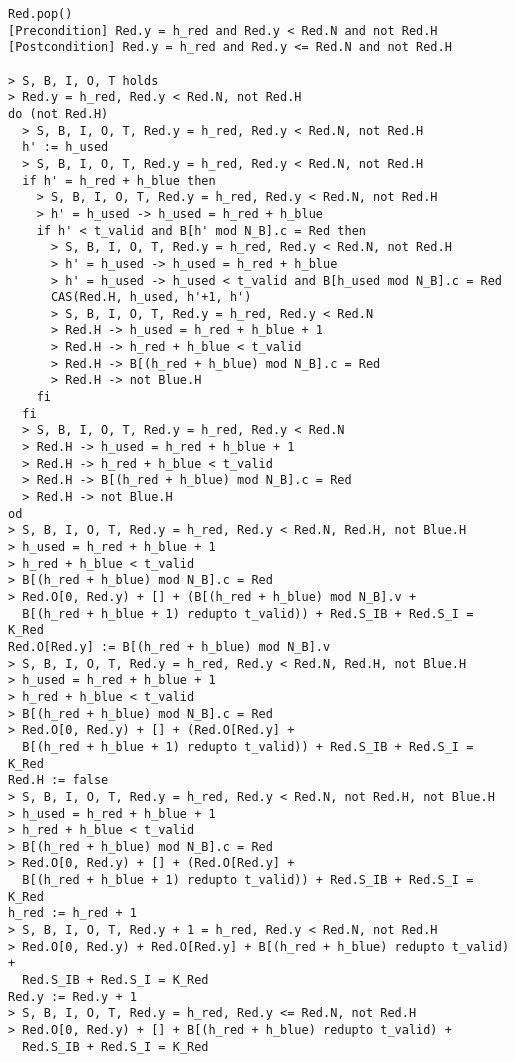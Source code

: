 \documentclass[a4paper, 11pt]{article}
\begin{document}
\begin{verbatim}
Red.pop()
[Precondition] Red.y = h_red and Red.y < Red.N and not Red.H
[Postcondition] Red.y = h_red and Red.y <= Red.N and not Red.H

> S, B, I, O, T holds
> Red.y = h_red, Red.y < Red.N, not Red.H
do (not Red.H)
  > S, B, I, O, T, Red.y = h_red, Red.y < Red.N, not Red.H
  h' := h_used
  > S, B, I, O, T, Red.y = h_red, Red.y < Red.N, not Red.H
  if h' = h_red + h_blue then
    > S, B, I, O, T, Red.y = h_red, Red.y < Red.N, not Red.H
    > h' = h_used -> h_used = h_red + h_blue
    if h' < t_valid and B[h' mod N_B].c = Red then
      > S, B, I, O, T, Red.y = h_red, Red.y < Red.N, not Red.H
      > h' = h_used -> h_used = h_red + h_blue
      > h' = h_used -> h_used < t_valid and B[h_used mod N_B].c = Red
      CAS(Red.H, h_used, h'+1, h')
      > S, B, I, O, T, Red.y = h_red, Red.y < Red.N
      > Red.H -> h_used = h_red + h_blue + 1
      > Red.H -> h_red + h_blue < t_valid
      > Red.H -> B[(h_red + h_blue) mod N_B].c = Red
      > Red.H -> not Blue.H
    fi
  fi
  > S, B, I, O, T, Red.y = h_red, Red.y < Red.N
  > Red.H -> h_used = h_red + h_blue + 1
  > Red.H -> h_red + h_blue < t_valid
  > Red.H -> B[(h_red + h_blue) mod N_B].c = Red
  > Red.H -> not Blue.H
od
> S, B, I, O, T, Red.y = h_red, Red.y < Red.N, Red.H, not Blue.H
> h_used = h_red + h_blue + 1
> h_red + h_blue < t_valid
> B[(h_red + h_blue) mod N_B].c = Red
> Red.O[0, Red.y) + [] + (B[(h_red + h_blue) mod N_B].v + 
  B[(h_red + h_blue + 1) redupto t_valid)) + Red.S_IB + Red.S_I = K_Red
Red.O[Red.y] := B[(h_red + h_blue) mod N_B].v
> S, B, I, O, T, Red.y = h_red, Red.y < Red.N, Red.H, not Blue.H
> h_used = h_red + h_blue + 1
> h_red + h_blue < t_valid
> B[(h_red + h_blue) mod N_B].c = Red
> Red.O[0, Red.y) + [] + (Red.O[Red.y] + 
  B[(h_red + h_blue + 1) redupto t_valid)) + Red.S_IB + Red.S_I = K_Red
Red.H := false
> S, B, I, O, T, Red.y = h_red, Red.y < Red.N, not Red.H, not Blue.H
> h_used = h_red + h_blue + 1
> h_red + h_blue < t_valid
> B[(h_red + h_blue) mod N_B].c = Red
> Red.O[0, Red.y) + [] + (Red.O[Red.y] + 
  B[(h_red + h_blue + 1) redupto t_valid)) + Red.S_IB + Red.S_I = K_Red
h_red := h_red + 1
> S, B, I, O, T, Red.y + 1 = h_red, Red.y < Red.N, not Red.H
> Red.O[0, Red.y) + Red.O[Red.y] + B[(h_red + h_blue) redupto t_valid) + 
  Red.S_IB + Red.S_I = K_Red
Red.y := Red.y + 1
> S, B, I, O, T, Red.y = h_red, Red.y <= Red.N, not Red.H
> Red.O[0, Red.y) + [] + B[(h_red + h_blue) redupto t_valid) + 
  Red.S_IB + Red.S_I = K_Red
\end{verbatim}
\end{document}
